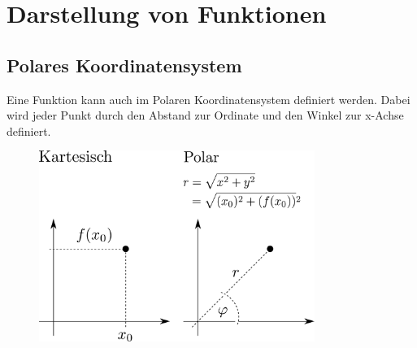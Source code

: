 



\section{Darstellung von Funktionen}
\subsection{Polares Koordinatensystem}
Eine Funktion kann auch im Polaren Koordinatensystem definiert werden. 
Dabei wird jeder Punkt durch den Abstand zur Ordinate und den Winkel zur x-Achse definiert. 

\begin{figure}[h!]
\centering
\includegraphics[width=0.8\textwidth]{polar.pdf}
\end{figure}


